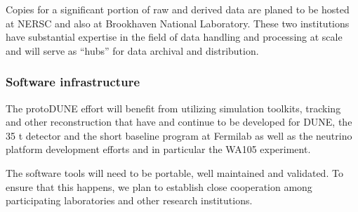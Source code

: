 Copies for a significant portion of raw and derived data are planed to be hosted at NERSC and also at Brookhaven National Laboratory.
These two institutions have substantial expertise  in the field of data handling and processing at scale and will serve as ``hubs'' for data archival and distribution.


\subsubsection{Software infrastructure}

The protoDUNE effort will benefit from utilizing simulation toolkits, tracking and other reconstruction
that have and continue to be developed for DUNE, the 35 t detector and the short baseline program at Fermilab as well as the 
neutrino platform development efforts and in particular the WA105 experiment.

The software tools will need to be portable, well maintained and validated. To ensure that this happens,
we plan to establish close cooperation among participating laboratories and other research institutions.



